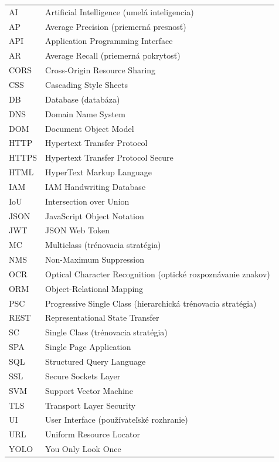 %
%
\begin{tabular}{ll}
  AI    & Artificial Intelligence (umelá inteligencia) \\
  AP    & Average Precision (priemerná presnosť) \\
  API   & Application Programming Interface \\
  AR    & Average Recall (priemerná pokrytosť) \\
  CORS  & Cross-Origin Resource Sharing \\
  CSS   & Cascading Style Sheets \\
  DB    & Database (databáza) \\
  DNS   & Domain Name System \\
  DOM   & Document Object Model \\
  HTTP  & Hypertext Transfer Protocol \\
  HTTPS & Hypertext Transfer Protocol Secure \\
  HTML  & HyperText Markup Language \\
  IAM   & IAM Handwriting Database \\
  IoU   & Intersection over Union \\
  JSON  & JavaScript Object Notation \\
  JWT   & JSON Web Token \\
  MC    & Multiclass (trénovacia stratégia) \\
  NMS   & Non-Maximum Suppression \\
  OCR   & Optical Character Recognition (optické rozpoznávanie znakov) \\
  ORM   & Object-Relational Mapping \\
  PSC   & Progressive Single Class (hierarchická trénovacia stratégia) \\
  REST  & Representational State Transfer \\
  SC    & Single Class (trénovacia stratégia) \\
  SPA   & Single Page Application \\
  SQL   & Structured Query Language \\
  SSL   & Secure Sockets Layer \\
  SVM   & Support Vector Machine \\
  TLS   & Transport Layer Security \\
  UI    & User Interface (používateľské rozhranie) \\
  URL   & Uniform Resource Locator \\
  YOLO  & You Only Look Once \\
\end{tabular}

